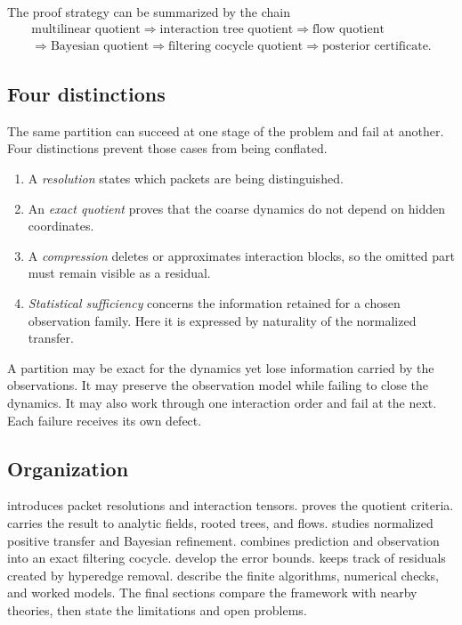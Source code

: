 The proof strategy can be summarized by the chain
\[
\boxed{
\begin{gathered}
  \text{multilinear quotient}
  \Longrightarrow
  \text{interaction tree quotient}
  \Longrightarrow
  \text{flow quotient}
  \\
  \Longrightarrow
  \text{Bayesian quotient}
  \Longrightarrow
  \text{filtering cocycle quotient}
  \Longrightarrow
  \text{posterior certificate}.
\end{gathered}}
\]

\subsection{Four distinctions}
The same partition can succeed at one stage of the problem and fail at another.  Four distinctions prevent those cases from being conflated.

\begin{enumerate}[label=(\roman*),leftmargin=2.5em]
\item A \emph{resolution} states which packets are being distinguished.
\item An \emph{exact quotient} proves that the coarse dynamics do not depend on hidden coordinates.
\item A \emph{compression} deletes or approximates interaction blocks, so the omitted part must remain visible as a residual.
\item \emph{Statistical sufficiency} concerns the information retained for a chosen observation family.  Here it is expressed by naturality of the normalized transfer.
\end{enumerate}

A partition may be exact for the dynamics yet lose information carried by the observations.  It may preserve the observation model while failing to close the dynamics.  It may also work through one interaction order and fail at the next.  Each failure receives its own defect.

\subsection{Organization}
 introduces packet resolutions and interaction tensors.   proves the quotient criteria.   carries the result to analytic fields, rooted trees, and flows.   studies normalized positive transfer and Bayesian refinement.   combines prediction and observation into an exact filtering cocycle.   develop the error bounds.   keeps track of residuals created by hyperedge removal.   describe the finite algorithms, numerical checks, and worked models.  The final sections compare the framework with nearby theories, then state the limitations and open problems.

